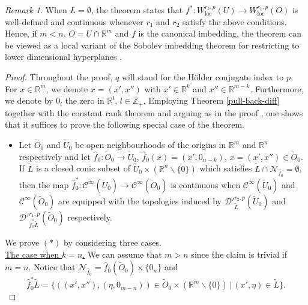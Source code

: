 \documentclass[12pt,reqno]{amsart}
\newcommand{\RR}{\mathbb R}
\newcommand{\ZZ}{\mathbb Z}
\newcommand{\DD}{\mathcal D}
\theoremstyle{plain}
\theoremstyle{remark}
\newtheorem{remark}[theorem]{Remark}
\theoremstyle{definition}
\numberwithin{equation}{section}
\begin{document}
\begin{remark}
When $L=\emptyset$, the theorem states that $f^*:W^{r_2,p}_{\operatorname{loc}}(U)\rightarrow W^{r_1,p}_{\operatorname{loc}}(O)$ is well-defined and continuous whenever $r_1$ and $r_2$ satisfy the above conditions. Hence, if $m<n$, $O=U\cap \RR^m$ and $f$ is the canonical imbedding, the theorem can be viewed as a local variant of the Sobolev imbedding theorem for restricting to lower dimensional hyperplanes \cite[Theorem 4.12, p. 85]{adams}.
\end{remark}

\begin{proof}
Throughout the proof, $q$ will stand for the H\"older conjugate index to $p$. For $x\in\RR^m$, we denote $x=(x',x'')$ with $x'\in\RR^k$ and $x''\in\RR^{m-k}$. Furthermore, we denote by $0_l$ the zero in $\RR^l$, $l\in\ZZ_+$. Employing Theorem \ref{pull-back-diff} together with the constant rank theorem \cite[Theorem 4.12, p. 81]{lee} and arguing as in the proof \cite[Theorem 3.21, CASE 3]{PP}, one shows that it suffices to prove the following special case of the theorem.
\begin{itemize}
\item[$(*)$]Let $\widetilde{O}_0$ and $\widetilde{U}_0$ be open neighbourhoods of the origins in $\RR^m$ and $\RR^n$ respectively and let $\hat{f}_0:\widetilde{O}_0\rightarrow \widetilde{U}_0$, $\hat{f}_0(x)=(x',0_{n-k})$, $x=(x',x'')\in \widetilde{O}_0$. If $\widetilde{L}$ is a closed conic subset of $\widetilde{U}_0\times(\RR^n\backslash\{0\})$ which satisfies $\widetilde{L}\cap \mathcal{N}_{\hat{f}_0}=\emptyset$, then the map $\hat{f}_0^*:\mathcal{C}^{\infty}(\widetilde{U}_0)\rightarrow\mathcal{C}^{\infty}(\widetilde{O}_0)$ is continuous when $\mathcal{C}^{\infty}(\widetilde{U}_0)$ and $\mathcal{C}^{\infty}(\widetilde{O}_0)$ are equipped with the topologies induced by $\DD'^{r_2,p}_{\widetilde{L}}(\widetilde{U}_0)$ and $\DD'^{r_1,p}_{\hat{f}^*_0\widetilde{L}}(\widetilde{O}_0)$ respectively.
\end{itemize}
We prove $(*)$ by considering three cases.\\
\indent \underline{The case when $k=n$.} We can assume that $m>n$ since the claim is trivial if $m=n$. Notice that $\mathcal{N}_{\hat{f}_0}=\hat{f}_0(\widetilde{O}_0)\times \{0_n\}$ and
\begin{equation*}
\hat{f}_0^*\widetilde{L}=\{((x',x''),(\eta,0_{m-n}))\in \widetilde{O}_0\times(\RR^m\backslash \{0\})\,|\, (x',\eta)\in\widetilde{L}\}.\label{pul-bac-conic}
\end{equation*}

\end{proof}
\end{document}
